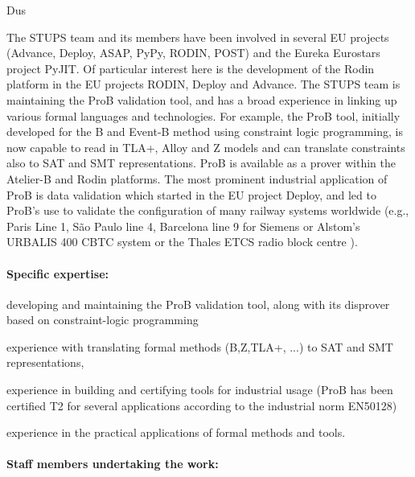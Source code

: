 \begin{sitedescription}{Dus}


The STUPS team and its members have been involved in several EU projects
 (Advance, Deploy, ASAP, PyPy, RODIN, POST) and the Eureka Eurostars project PyJIT.
Of particular interest here is the development of the Rodin platform in the EU projects RODIN, Deploy and Advance.
The STUPS team is maintaining the ProB validation tool, and has a broad experience
 in linking up various formal languages and technologies.
For example, the ProB tool, initially developed for the B and Event-B method using constraint logic programming,
 is now capable to read in TLA+, Alloy and Z models and
 can translate constraints also to SAT and SMT representations.
ProB is available as a prover within the Atelier-B and Rodin platforms.
The most prominent industrial application of ProB is
 data validation which started in the EU project Deploy, and led to
 ProB's use to validate the configuration of many railway systems worldwide
 (e.g.,
 Paris Line 1,  S\~{a}o Paulo line 4, Barcelona line 9 for Siemens
 or Alstom's URBALIS 400 CBTC system %
 or the Thales ETCS radio block centre
 ).

\paragraph*{Specific expertise:}

\begin{compactitem}
\item %
      developing and maintaining the ProB validation tool, along with
      its disprover based on constraint-logic programming
 \item experience with translating formal methods (B,Z,TLA+, ...)
       to SAT and SMT representations,
 \item experience in building and certifying tools for industrial usage (ProB has been certified T2
  for several applications according to the industrial norm EN50128)
 \item experience in the practical applications of formal methods and tools.
\end{compactitem}

\paragraph*{Staff members undertaking the work:}


\end{sitedescription}

